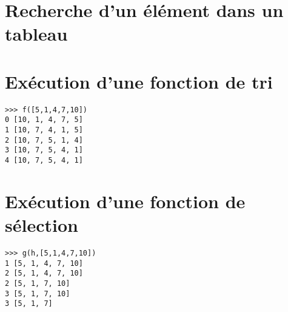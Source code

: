 \documentclass[11pt,a4paper]{article}
\begin{document}
\section{Recherche d'un élément dans un tableau}


\section{Exécution d'une fonction de tri}
%

\begin{py}{8cm}
\begin{verbatim}
>>> f([5,1,4,7,10])
0 [10, 1, 4, 7, 5]
1 [10, 7, 4, 1, 5]
2 [10, 7, 5, 1, 4]
3 [10, 7, 5, 4, 1]
4 [10, 7, 5, 4, 1]
\end{verbatim}
\end{py}

\section{Exécution d'une fonction de sélection}
%

\begin{py}{8cm}
\begin{verbatim}
>>> g(h,[5,1,4,7,10])
1 [5, 1, 4, 7, 10]
2 [5, 1, 4, 7, 10]
2 [5, 1, 7, 10]
3 [5, 1, 7, 10]
3 [5, 1, 7]
\end{verbatim}
\end{py}

\label{fini}
\end{document}
